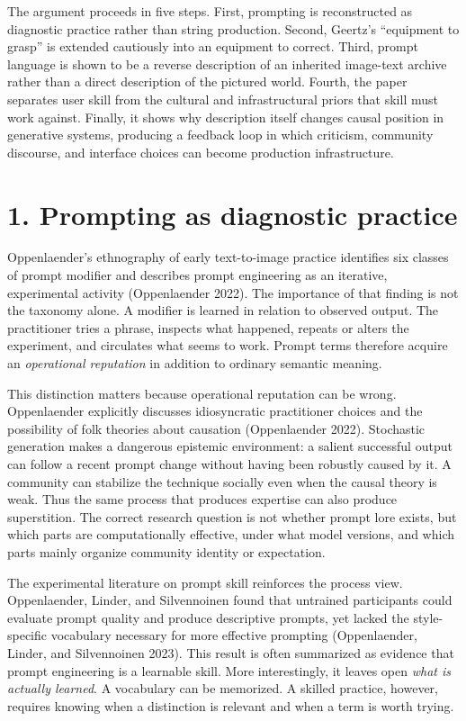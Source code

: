 \documentclass[
  11pt,
  letterpaper,
]{article}
\begin{document}
The argument proceeds in five steps. First, prompting is reconstructed
as diagnostic practice rather than string production. Second, Geertz's
``equipment to grasp'' is extended cautiously into an equipment to
correct. Third, prompt language is shown to be a reverse description of
an inherited image-text archive rather than a direct description of the
pictured world. Fourth, the paper separates user skill from the cultural
and infrastructural priors that skill must work against. Finally, it
shows why description itself changes causal position in generative
systems, producing a feedback loop in which criticism, community
discourse, and interface choices can become production infrastructure.

\section{1. Prompting as diagnostic
practice}\label{prompting-as-diagnostic-practice}

Oppenlaender's ethnography of early text-to-image practice identifies
six classes of prompt modifier and describes prompt engineering as an
iterative, experimental activity (Oppenlaender 2022). The importance of
that finding is not the taxonomy alone. A modifier is learned in
relation to observed output. The practitioner tries a phrase, inspects
what happened, repeats or alters the experiment, and circulates what
seems to work. Prompt terms therefore acquire an \emph{operational
reputation} in addition to ordinary semantic meaning.

This distinction matters because operational reputation can be wrong.
Oppenlaender explicitly discusses idiosyncratic practitioner choices and
the possibility of folk theories about causation (Oppenlaender 2022).
Stochastic generation makes a dangerous epistemic environment: a salient
successful output can follow a recent prompt change without having been
robustly caused by it. A community can stabilize the technique socially
even when the causal theory is weak. Thus the same process that produces
expertise can also produce superstition. The correct research question
is not whether prompt lore exists, but which parts are computationally
effective, under what model versions, and which parts mainly organize
community identity or expectation.

The experimental literature on prompt skill reinforces the process view.
Oppenlaender, Linder, and Silvennoinen found that untrained participants
could evaluate prompt quality and produce descriptive prompts, yet
lacked the style-specific vocabulary necessary for more effective
prompting (Oppenlaender, Linder, and Silvennoinen 2023). This result is
often summarized as evidence that prompt engineering is a learnable
skill. More interestingly, it leaves open \emph{what is actually
learned}. A vocabulary can be memorized. A skilled practice, however,
requires knowing when a distinction is relevant and when a term is worth
trying.
\end{document}
